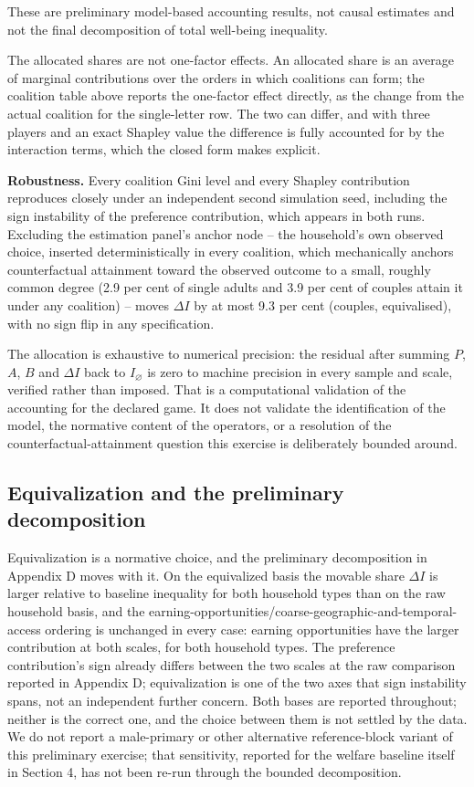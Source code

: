 \documentclass[11pt,a4paper]{article}
\begin{document}
These are preliminary model-based accounting results, not causal estimates and not the final decomposition of total well-being inequality.

The allocated shares are not one-factor effects. An allocated share is an average of marginal contributions over the orders in which coalitions can form; the coalition table above reports the one-factor effect directly, as the change from the actual coalition for the single-letter row. The two can differ, and with three players and an exact Shapley value the difference is fully accounted for by the interaction terms, which the closed form makes explicit.

\textbf{Robustness.} Every coalition Gini level and every Shapley contribution reproduces closely under an independent second simulation seed, including the sign instability of the preference contribution, which appears in both runs. Excluding the estimation panel's anchor node -- the household's own observed choice, inserted deterministically in every coalition, which mechanically anchors counterfactual attainment toward the observed outcome to a small, roughly common degree (2.9 per cent of single adults and 3.9 per cent of couples attain it under any coalition) -- moves \(\Delta I\) by at most 9.3 per cent (couples, equivalised), with no sign flip in any specification.

The allocation is exhaustive to numerical precision: the residual after summing \(P\), \(A\), \(B\) and \(\Delta I\) back to \(I_\varnothing\) is zero to machine precision in every sample and scale, verified rather than imposed. That is a computational validation of the accounting for the declared game. It does not validate the identification of the model, the normative content of the operators, or a resolution of the counterfactual-attainment question this exercise is deliberately bounded around.

\subsection{Equivalization and the preliminary decomposition}\label{equivalization-and-the-preliminary-decomposition}

Equivalization is a normative choice, and the preliminary decomposition in Appendix D moves with it. On the equivalized basis the movable share \(\Delta I\) is larger relative to baseline inequality for both household types than on the raw household basis, and the earning-opportunities/coarse-geographic-and-temporal-access ordering is unchanged in every case: earning opportunities have the larger contribution at both scales, for both household types. The preference contribution's sign already differs between the two scales at the raw comparison reported in Appendix D; equivalization is one of the two axes that sign instability spans, not an independent further concern. Both bases are reported throughout; neither is the correct one, and the choice between them is not settled by the data. We do not report a male-primary or other alternative reference-block variant of this preliminary exercise; that sensitivity, reported for the welfare baseline itself in Section 4, has not been re-run through the bounded decomposition.
\end{document}
